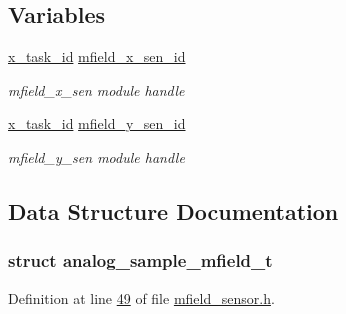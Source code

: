 \subsection*{Variables}
\begin{DoxyCompactItemize}
\item 
\hyperlink{a00036_ad5c3c5fbfd3e4aadf22830395484a71d}{x\+\_\+task\+\_\+id} \hyperlink{a00019_a19a33e680bf19d1aed76750132ed8b64}{mfield\+\_\+x\+\_\+sen\+\_\+id}
\begin{DoxyCompactList}\small\item\em mfield\+\_\+x\+\_\+sen module handle \end{DoxyCompactList}\item 
\hyperlink{a00036_ad5c3c5fbfd3e4aadf22830395484a71d}{x\+\_\+task\+\_\+id} \hyperlink{a00019_a99c4ad3cf8b9ce2b67351d6edf48f937}{mfield\+\_\+y\+\_\+sen\+\_\+id}
\begin{DoxyCompactList}\small\item\em mfield\+\_\+y\+\_\+sen module handle \end{DoxyCompactList}\end{DoxyCompactItemize}


\subsection{Data Structure Documentation}
\label{d4/d81/a00110}
\hypertarget{a00019_d4/d81/a00110}{}
\subsubsection{struct analog\+\_\+sample\+\_\+mfield\+\_\+t}


Definition at line \hyperlink{a00019_source_l00049}{49} of file \hyperlink{a00019_source}{mfield\+\_\+sensor.\+h}.



